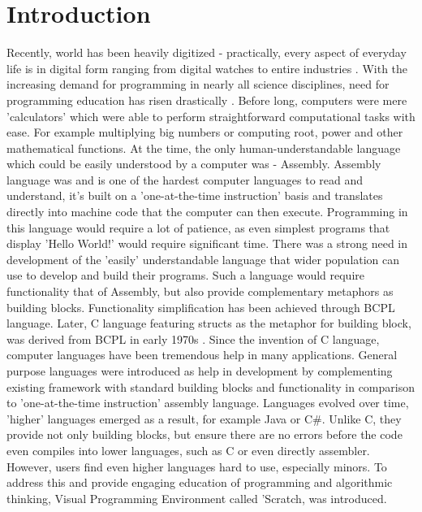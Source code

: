 \documentclass{article}
\begin{document}
\section{Introduction}
Recently, world has been heavily digitized - practically, every aspect of everyday life is in digital form ranging from digital watches to entire industries \citep{jovanovi_digitalization}. With the increasing demand for programming in nearly all science disciplines, need for programming education has risen drastically \citep{MargGoodBern2011wv, jovanovi_digitalization, 7318200}.
Before long, computers were mere 'calculators' which were able to perform straightforward computational tasks with ease. For example multiplying big numbers or computing root, power and other mathematical functions. At the time, the only human-understandable language which could be easily understood by a computer was - Assembly.
Assembly language was and is one of the hardest computer languages to read and understand, it's built on a 'one-at-the-time instruction' basis and translates directly into machine code that the computer can then execute. Programming in this language would require a lot of patience, as even simplest programs that display 'Hello World!' would require significant time.
There was a strong need in development of the 'easily' understandable language that wider population can use to develop and build their programs. Such a language would require functionality that of Assembly, but also provide complementary metaphors as building blocks. Functionality simplification has been achieved through BCPL language. Later, C language featuring structs as the metaphor for building block, was derived from BCPL in early 1970s \citep{ritchie_the}.
Since the invention of C language, computer languages have been tremendous help in many applications. General purpose languages were introduced as help in development by complementing existing framework with standard building blocks and functionality in comparison to 'one-at-the-time instruction' assembly language.\citep{10.1145/364063.364092}
Languages evolved over time, 'higher' languages emerged as a result, for example Java or C\#. Unlike C, they provide not only building blocks, but ensure there are no errors before the code even compiles into lower languages, such as C or even directly assembler. However, users find even higher languages hard to use, especially minors. To address this and provide engaging education of programming and algorithmic thinking, Visual Programming Environment called 'Scratch, was introduced.\citep{1314376}
\end{document}
